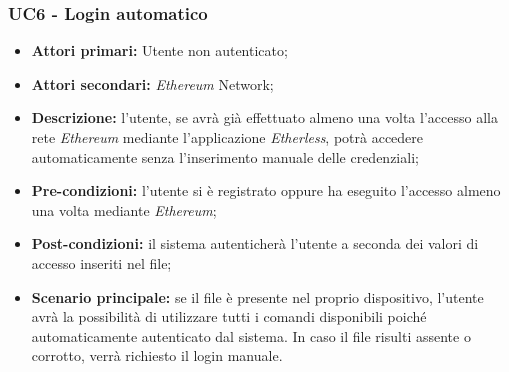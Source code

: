 \subsubsection{UC6 - Login automatico}
\begin{itemize}
	\item \textbf{Attori primari:} Utente non autenticato;
	\item \textbf{Attori secondari:} \textit{Ethereum\glo} Network;
	\item \textbf{Descrizione:} l'utente, se avrà già effettuato almeno una volta l'accesso alla rete \textit{Ethereum\glo} mediante l'applicazione \textit{Etherless}, potrà accedere automaticamente senza l'inserimento manuale delle credenziali; 
	\item \textbf{Pre-condizioni:} l'utente si è registrato oppure ha eseguito l'accesso almeno una volta mediante \textit{Ethereum\glos};
	\item \textbf{Post-condizioni:} il sistema autenticherà l'utente a seconda dei valori di accesso inseriti nel file;
	\item \textbf{Scenario principale:} se il file è presente nel proprio dispositivo, l'utente avrà la possibilità di utilizzare tutti i comandi disponibili poiché automaticamente autenticato dal sistema. In caso il file risulti assente o corrotto, verrà richiesto il login manuale.
\end{itemize}
